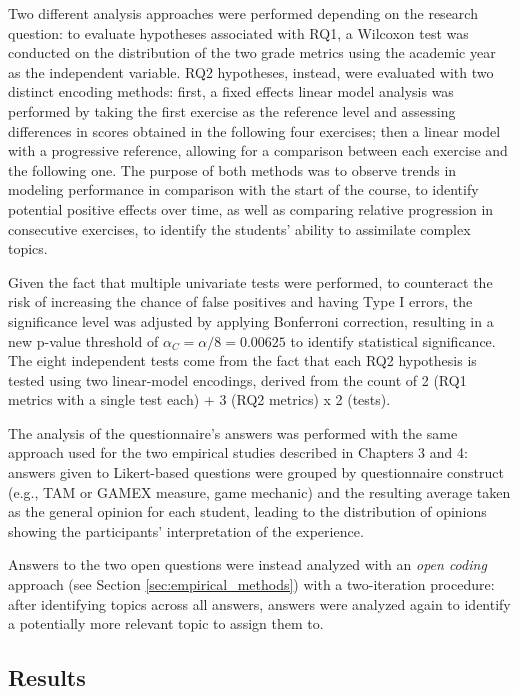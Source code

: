 Two different analysis approaches were performed depending on the research question: to evaluate hypotheses associated with RQ1, a Wilcoxon test was conducted on the distribution of the two grade metrics using the academic year as the independent variable. RQ2 hypotheses, instead, were evaluated with two distinct encoding methods: first, a fixed effects linear model analysis was performed by taking the first exercise as the reference level and assessing differences in scores obtained in the following four exercises; then a linear model with a progressive reference, allowing for a comparison between each exercise and the following one. The purpose of both methods was to observe trends in modeling performance in comparison with the start of the course, to identify potential positive effects over time, as well as comparing relative progression in consecutive exercises, to identify the students' ability to assimilate complex topics.

Given the fact that multiple univariate tests were performed, to counteract the risk of increasing the chance of false positives and having Type I errors, the significance level was adjusted by applying Bonferroni correction, resulting in a new p-value threshold of $\alpha_C = \alpha / 8 =  0.00625$ to identify statistical significance. The eight independent tests come from the fact that each RQ2 hypothesis is tested using two linear-model encodings, derived from the count of 2 (RQ1 metrics with a single test each) + 3 (RQ2 metrics) x 2 (tests).

The analysis of the questionnaire's answers was performed with the same approach used for the two empirical studies described in Chapters 3 and 4: answers given to Likert-based questions were grouped by questionnaire construct (e.g., TAM or GAMEX measure, game mechanic) and the resulting average taken as the general opinion for each student, leading to the distribution of opinions showing the participants' interpretation of the experience.

Answers to the two open questions were instead analyzed with an \textit{open coding} approach (see Section \ref{sec:empirical_methods})\cite{strauss1998basics} with a two-iteration procedure: after identifying topics across all answers, answers were analyzed again to identify a potentially more relevant topic to assign them to. 

\subsection{Results}

